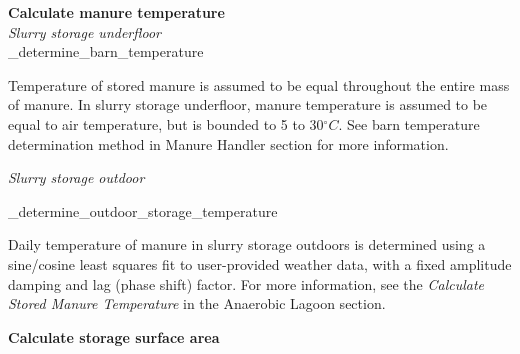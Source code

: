 \begin{refsection}
\textbf{Calculate manure temperature}\\
\textit{Slurry storage underfloor}\\

\_determine\_barn\_temperature\\
\vspace{0.25cm}

Temperature of stored manure is assumed to be equal throughout the entire mass of manure. In slurry storage underfloor, manure temperature is assumed to be equal to air temperature, but is bounded to 5 to 30\(^\circ C\). See barn temperature determination method in Manure Handler section for more information. 

\vspace{0.5cm}
\textit{Slurry storage outdoor}

\_determine\_outdoor\_storage\_temperature\\
\vspace{0.25cm}

Daily temperature of manure in slurry storage outdoors is determined using a sine/cosine least squares fit to user-provided weather data, with a fixed amplitude damping and lag (phase shift) factor. For more information, see the \textit{Calculate Stored Manure Temperature} in the Anaerobic Lagoon section.
\vspace{0.5cm}


\textbf{Calculate storage surface area}\\
\vspace{0.25cm}


\end{refsection}
